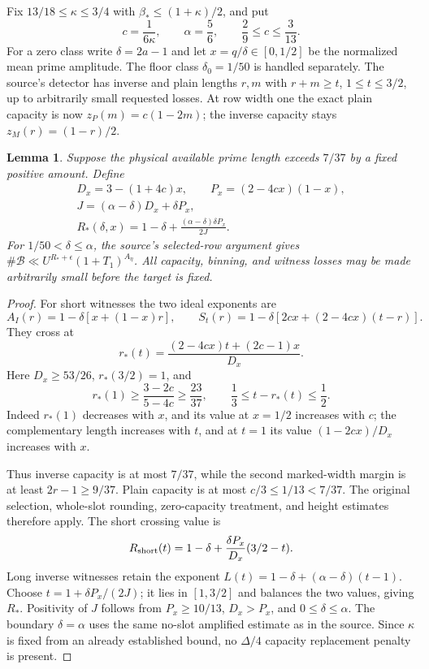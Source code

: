 \documentclass[11pt]{article}
\newtheorem{lemma}{Lemma}
\newcommand{\Bstar}{\beta_*}
\begin{document}
Fix $13/18\le\kappa\le3/4$ with $\Bstar\le(1+\kappa)/2$, and put
\[
 c=\frac1{6\kappa},\qquad \alpha=\frac56,
 \qquad\frac29\le c\le\frac3{13}.
\]
For a zero class write $\delta=2a-1$ and let
$x=q/\delta\in[0,1/2]$ be the normalized mean prime amplitude.
The floor class $\delta_0=1/50$ is handled separately. The source's
detector has inverse and plain lengths $r,m$ with $r+m\ge t$,
$1\le t\le3/2$, up to arbitrarily small requested losses.
At row width one the exact plain capacity is now
$z_P(m)=c(1-2m)$; the inverse capacity stays $z_M(r)=(1-r)/2$.

\begin{lemma}\label{lem:count}
Suppose the physical available prime length exceeds $7/37$ by a fixed
positive amount. Define
\begin{gather*}
 D_x=3-(1+4c)x,\qquad P_x=(2-4cx)(1-x),\\
 J=(\alpha-\delta)D_x+\delta P_x,\\
 R_*(\delta,x)=1-\delta+
 \frac{(\alpha-\delta)\delta P_x}{2J}.
\end{gather*}
For $1/50<\delta\le\alpha$, the source's selected-row argument gives
$\#\mathcal B\ll U^{R_*+\epsilon}(1+T_1)^{A_\eta}$.
All capacity, binning, and witness losses may be made arbitrarily small
before the target is fixed.
\end{lemma}
\begin{proof}
For short witnesses the two ideal exponents are
\[
 A_I(r)=1-\delta[x+(1-x)r],\qquad
 S_t(r)=1-\delta[2cx+(2-4cx)(t-r)].
\]
They cross at
\[
 r_*(t)=\frac{(2-4cx)t+(2c-1)x}{D_x}.
\]
Here $D_x\ge53/26$, $r_*(3/2)=1$, and
\[
 r_*(1)\ge\frac{3-2c}{5-4c}\ge\frac{23}{37},
 \qquad\frac13\le t-r_*(t)\le\frac12.
\]
Indeed $r_*(1)$ decreases with $x$, and its value at $x=1/2$
increases with $c$; the complementary length increases with $t$,
and at $t=1$ its value $(1-2cx)/D_x$ increases with $x$.

Thus inverse capacity is at most $7/37$, while the second marked-width
margin is at least $2r-1\ge9/37$. Plain capacity is at most
$c/3\le1/13<7/37$. The original selection, whole-slot rounding,
zero-capacity treatment, and height estimates therefore apply.
The short crossing value is
\[
 R_{\rm short}(t)=1-\delta+\frac{\delta P_x}{D_x}(3/2-t).
\]
Long inverse witnesses retain the exponent
$L(t)=1-\delta+(\alpha-\delta)(t-1)$.
Choose $t=1+\delta P_x/(2J)$; it lies in $[1,3/2]$ and balances
the two values, giving $R_*$. Positivity of $J$ follows from
$P_x\ge10/13$, $D_x>P_x$, and $0\le\delta\le\alpha$.
The boundary $\delta=\alpha$ uses the same no-slot amplified estimate
as in the source. Since $\kappa$ is fixed from an already established
bound, no $\Delta/4$ capacity replacement penalty is present.
\end{proof}
\end{document}
